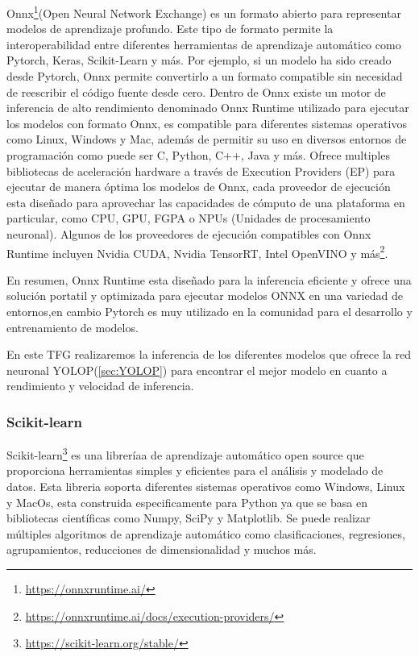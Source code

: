 Onnx\footnote{\url{https://onnxruntime.ai/}}(Open Neural Network Exchange) es un formato abierto para representar modelos de aprendizaje profundo. Este tipo de formato 
permite la interoperabilidad entre diferentes herramientas de aprendizaje automático como Pytorch, Keras, Scikit-Learn y más. Por ejemplo, si un modelo ha sido creado desde Pytorch, Onnx permite convertirlo 
a un formato compatible sin necesidad de reescribir el código fuente desde cero. Dentro de Onnx existe un motor de inferencia de alto rendimiento denominado Onnx Runtime utilizado 
para ejecutar los modelos con formato Onnx, es compatible para diferentes sistemas operativos como Linux, Windows y Mac, además de permitir su uso en diversos entornos de programación
como puede ser C, Python, C++, Java y más. Ofrece multiples bibliotecas de aceleración hardware a través de Execution Providers (EP) para ejecutar de manera óptima los modelos de Onnx, cada proveedor de ejecución
esta diseñado para aprovechar las capacidades de cómputo de una plataforma en particular, como CPU, GPU, FGPA o NPUs (Unidades de procesamiento neuronal).
Algunos de los proveedores de ejecución compatibles con Onnx Runtime incluyen Nvidia CUDA, Nvidia TensorRT, Intel OpenVINO y más\footnote{\url{https://onnxruntime.ai/docs/execution-providers/}}. \newline

En resumen, Onnx Runtime esta diseñado para la inferencia eficiente y ofrece una solución portatil y optimizada para ejecutar modelos ONNX en una variedad de entornos,en cambio Pytorch es muy utilizado 
en la comunidad para el desarrollo y entrenamiento de modelos. \newline

En este TFG realizaremos la inferencia de los diferentes modelos que ofrece la red neuronal YOLOP(\ref{sec:YOLOP}) para encontrar el mejor
modelo en cuanto a rendimiento y velocidad de inferencia. 

\subsubsection{Scikit-learn}
\label{Scikit-learn}

Scikit-learn\footnote{\url{https://scikit-learn.org/stable/}} es una libreríaa de aprendizaje automático open source que proporciona herramientas simples y eficientes para el análisis 
y modelado de datos. Esta libreria soporta diferentes sistemas operativos como Windows, Linux y MacOs, esta construida especificamente para Python ya que se basa en bibliotecas
científicas como Numpy, SciPy y Matplotlib. Se puede realizar múltiples algoritmos de aprendizaje automático como clasificaciones, regresiones, agrupamientos, reducciones de dimensionalidad y 
muchos más. 


